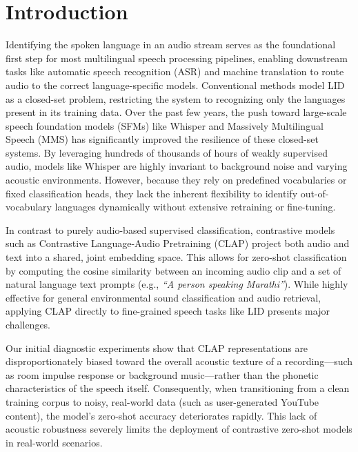 \documentclass[conference]{IEEEtran}
\begin{document}
\section{Introduction}

Identifying the spoken language in an audio stream serves as the foundational first step for most multilingual speech processing pipelines, enabling downstream tasks like automatic speech recognition (ASR) and machine translation to route audio to the correct language-specific models. Conventional methods model LID as a closed-set problem, restricting the system to recognizing only the languages present in its training data. Over the past few years, the push toward large-scale speech foundation models (SFMs) like Whisper \cite{radford2023robust} and Massively Multilingual Speech (MMS) \cite{pratap2023scaling} has significantly improved the resilience of these closed-set systems. By leveraging hundreds of thousands of hours of weakly supervised audio, models like Whisper are highly invariant to background noise and varying acoustic environments. However, because they rely on predefined vocabularies or fixed classification heads, they lack the inherent flexibility to identify out-of-vocabulary languages dynamically without extensive retraining or fine-tuning.

In contrast to purely audio-based supervised classification, contrastive models such as Contrastive Language-Audio Pretraining (CLAP) \cite{elizalde2023clap, wu2023large} project both audio and text into a shared, joint embedding space. This allows for zero-shot classification by computing the cosine similarity between an incoming audio clip and a set of natural language text prompts (e.g., \textit{``A person speaking Marathi''}). While highly effective for general environmental sound classification and audio retrieval, applying CLAP directly to fine-grained speech tasks like LID presents major challenges. 

Our initial diagnostic experiments show that CLAP representations are disproportionately biased toward the overall acoustic texture of a recording---such as room impulse response or background music---rather than the phonetic characteristics of the speech itself. Consequently, when transitioning from a clean training corpus to noisy, real-world data (such as user-generated YouTube content), the model's zero-shot accuracy deteriorates rapidly. This lack of acoustic robustness severely limits the deployment of contrastive zero-shot models in real-world scenarios.
\end{document}
